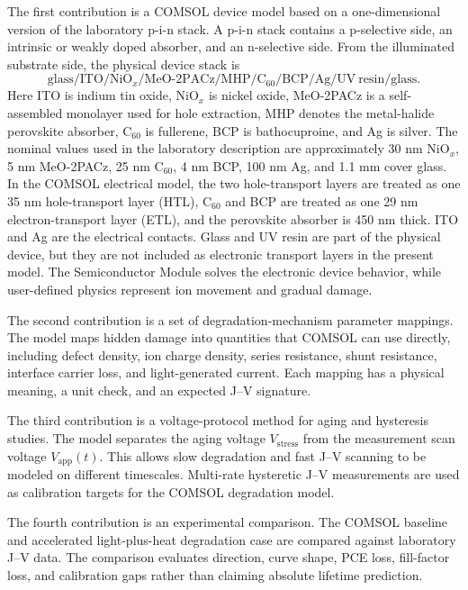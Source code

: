 The first contribution is a COMSOL device model based on a one-dimensional
version of the laboratory p-i-n stack. A p-i-n stack contains a p-selective
side, an intrinsic or weakly doped absorber, and an n-selective side. From the
illuminated substrate side, the physical device stack is
\begin{equation}
\mathrm{glass}/\mathrm{ITO}/\mathrm{NiO}_x/
\mathrm{MeO\mbox{-}2PACz}/\mathrm{MHP}/
\mathrm{C}_{60}/\mathrm{BCP}/\mathrm{Ag}/
\mathrm{UV\ resin}/\mathrm{glass}.
\end{equation}
Here ITO is indium tin oxide, NiO$_x$ is nickel oxide, MeO-2PACz is a
self-assembled monolayer used for hole extraction, MHP denotes the metal-halide
perovskite absorber, C$_{60}$ is fullerene, BCP is bathocuproine, and Ag is
silver.
The nominal values used in the laboratory description are approximately
30 nm NiO$_x$, 5 nm MeO-2PACz, 25 nm C$_{60}$, 4 nm BCP, 100 nm Ag, and
1.1 mm cover glass. In the COMSOL electrical model, the two hole-transport
layers are treated as one 35 nm hole-transport layer (HTL), C$_{60}$ and BCP
are treated as one 29 nm electron-transport layer (ETL), and the perovskite
absorber is 450 nm thick. ITO and Ag are the electrical contacts. Glass and UV
resin are part of the physical device, but they are not included as electronic
transport layers in the present model.
The Semiconductor Module solves the electronic device behavior, while
user-defined physics represent ion movement and gradual damage.

The second contribution is a set of degradation-mechanism parameter mappings.
The model maps hidden damage into quantities that COMSOL can use directly,
including defect density, ion charge density, series resistance, shunt
resistance, interface carrier loss, and light-generated current. Each mapping
has a physical meaning, a unit check, and an expected J--V signature.

The third contribution is a voltage-protocol method for aging and
hysteresis studies. The model separates the aging voltage
$V_{\mathrm{stress}}$ from the measurement scan voltage
$V_{\mathrm{app}}(t)$. This allows slow degradation and fast J--V scanning to
be modeled on different timescales. Multi-rate hysteretic J--V measurements are
used as calibration targets for the COMSOL degradation model.

The fourth contribution is an experimental comparison. The COMSOL
baseline and accelerated light-plus-heat degradation case are compared against
laboratory J--V data. The comparison evaluates direction, curve shape, PCE
loss, fill-factor loss, and calibration gaps rather than claiming absolute
lifetime prediction.

